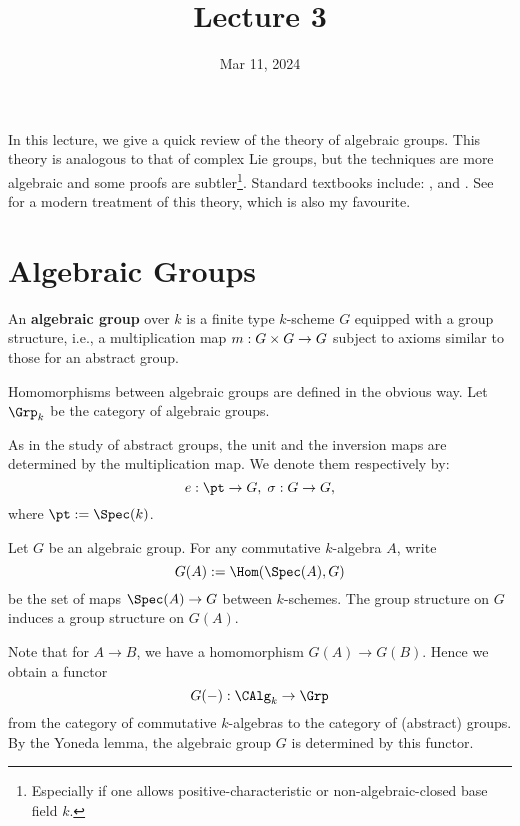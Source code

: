 





\title{Lecture 3}

\date{Mar 11, 2024}

\maketitle

In this lecture, we give a quick review of the theory of algebraic groups. This theory is analogous to that of complex Lie groups, but the techniques are more algebraic and some proofs are subtler\footnote{Especially if one allows positive-characteristic or non-algebraic-closed base field $k$.}. Standard textbooks include: \cite{B}, \cite{H} and \cite{Sp}. See \cite{M} for a modern treatment of this theory, which is also my favourite.



\section{Algebraic Groups}

\begin{defn}
	An \textbf{algebraic group} over $k$ is a finite type $k$-scheme $G$ equipped with a group structure, i.e., a multiplication map $m:G\mt G\to G$ subject to axioms similar to those for an abstract group.

	Homomorphisms between algebraic groups are defined in the obvious way. Let $\Grp_k$ be the category of algebraic groups.
\end{defn}

\begin{rem}
	As in the study of abstract groups, the unit and the inversion maps are determined by the multiplication map. We denote them respectively by:
	\[
		e: \pt \to G,\; \sigma: G\to G,
	\]
	where $\pt:=\Spec(k)$.
\end{rem}


\begin{constr}
	Let $G$ be an algebraic group. For any commutative $k$-algebra $A$, write
	\[
		G(A):= \Hom( \Spec(A),G )
	\]
	be the set of maps $\Spec(A)\to G$ between $k$-schemes. The group structure on $G$ induces a group structure on $G(A)$.

	Note that for $A\to B$, we have a homomorphism $G(A) \to G(B)$. Hence we obtain a functor
	\[
		G(-): \CAlg_k \to \Grp
	\]
	from the category of commutative $k$-algebras to the category of (abstract) groups. By the Yoneda lemma, the algebraic group $G$ is determined by this functor.
\end{constr}

